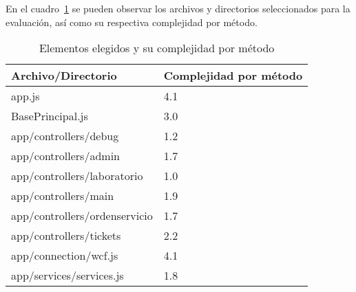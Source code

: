 En el cuadro~\ref{table:JSCC} se pueden observar los archivos y directorios 
seleccionados para la evaluación, así como su respectiva complejidad por método.
\begin{table}[hb]
\centering
    \begin{tabular}{|l|l|}
    \hline
    \textbf{Archivo/Directorio}            & \textbf{Complejidad por método} \\ \hline
    app.js                        & 4.1                    \\ \hline
    BasePrincipal.js              & 3.0                    \\ \hline
    app/controllers/debug         & 1.2                    \\ \hline
    app/controllers/admin         & 1.7                    \\ \hline
    app/controllers/laboratorio   & 1.0                    \\ \hline
    app/controllers/main          & 1.9                    \\ \hline
    app/controllers/ordenservicio & 1.7                    \\ \hline
    app/controllers/tickets       & 2.2                    \\ \hline
    app/connection/wcf.js         & 4.1                    \\ \hline
    app/services/services.js      & 1.8                    \\ \hline
    \end{tabular}
    \caption{Elementos elegidos y su complejidad por método}
    \label{table:JSCC}
\end{table}


